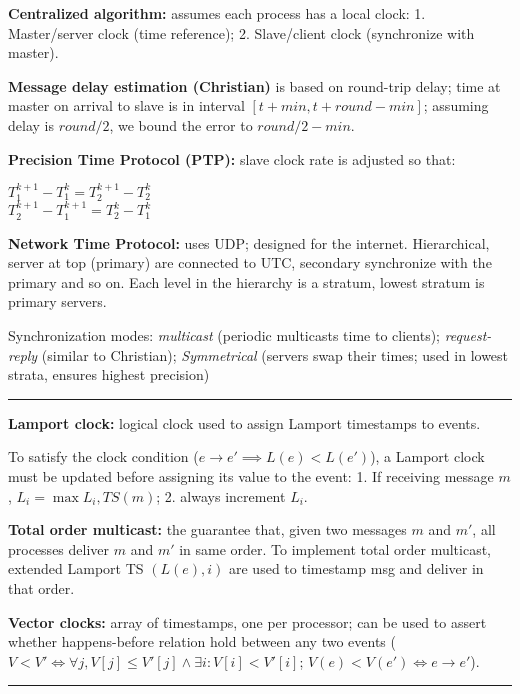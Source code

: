 \documentclass{form}
\begin{document}
\begin{multicols*}{2}
\textbf{Centralized algorithm:} assumes each process has a local clock: 1. Master/server clock (time reference); 2. Slave/client clock (synchronize with master).

\textbf{Message delay estimation (Christian)} is based on round-trip delay; time at master on arrival to slave is in interval $[t+min, t+round-min]$; assuming delay is $round/2$, we bound the error to $round/2 - min$.

\textbf{Precision Time Protocol (PTP):} slave clock rate is adjusted so that:

$T_1^{k+1} - T_1^k = T_2^{k+1} - T_2^k$\\
$T_2^{k+1} - T_1^{k+1} = T_2^k - T_1^k$

\textbf{Network Time Protocol:} uses UDP; designed for the internet. Hierarchical, server at top (primary) are connected to UTC, secondary synchronize with the primary and so on. Each level in the hierarchy is a stratum, lowest stratum is primary servers.

Synchronization modes: \textit{multicast} (periodic multicasts time to clients); \textit{request-reply} (similar to Christian); \textit{Symmetrical} (servers swap their times; used in lowest strata, ensures highest precision)

\vspace{-1em}\rule{\linewidth}{0.4pt}

\vfill\null
\columnbreak

\textbf{Lamport clock:} logical clock used to assign Lamport timestamps to events.

To satisfy the clock condition ($e \rightarrow e' \implies L(e) < L(e')$), a Lamport clock must be updated before assigning its value to the event: 1. If receiving message $m$, $L_i = \max{L_i, TS(m)}$; 2. always increment $L_i$.

\textbf{Total order multicast:} the guarantee that, given two messages $m$ and $m'$, all processes deliver $m$ and $m'$ in same order. To implement total order multicast, extended Lamport TS $(L(e), i)$ are used to timestamp msg and deliver in that order.

\textbf{Vector clocks:} array of timestamps, one per processor; can be used to assert whether happens-before relation hold between any two events ($V < V' \iff \forall j, V[j] \leq V'[j] \wedge \exists i : V[i] < V'[i]$; $V(e) < V(e') \iff e \rightarrow e'$).

\vspace{-1em}\rule{\linewidth}{0.4pt}


\end{multicols*}
\end{document}

